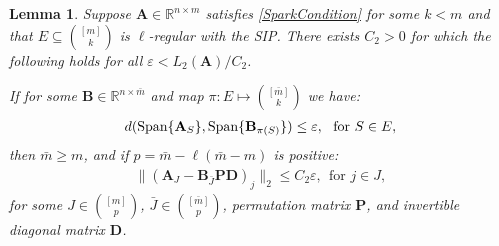 \documentclass[9pt,twocolumn]{pnas-new}
\newtheorem{lemma}{Lemma}
\begin{document}
\begin{lemma}\label{MainLemma}
Suppose $\mathbf{A} \in \mathbb{R}^{n \times m}$ satisfies \eqref{SparkCondition} for some $k < m$ and that $E \subseteq {[m] \choose k}$ is $\ell$-regular with the SIP. There exists $C_2 > 0$ for which the following holds for all $\varepsilon < L_2(\mathbf{A}) / C_2$. 


If for some  $\mathbf{B} \in \mathbb{R}^{n \times \bar m}$ and map $\pi: E \mapsto {[\bar m] \choose k}$ we have:
\begin{align}\label{GapUpperBound}
d(\text{\rm Span}\{\mathbf{A}_{S}\}, \text{\rm Span}\{\mathbf{B}_{\pi(S)}\}) \leq \varepsilon, \ \  \text{for $S \in E$},
\end{align}
%
then $\bar m \geq m$, and if $p = \bar m - \ell(\bar m - m)$ is positive:
\begin{align}\label{MainLemmaBPD}
\|(\mathbf{A}_J - \mathbf{B}_{\bar J}\mathbf{PD})_j\|_2 \leq C_2 \varepsilon, \ \  \text{for } j \in J,
\end{align}
for some $J \in {[m] \choose p}$, $\bar J \in {[\bar m] \choose p}$, permutation matrix $\mathbf{P}$, and invertible diagonal matrix $\mathbf{D}$.
\end{lemma}

%
\end{document}
